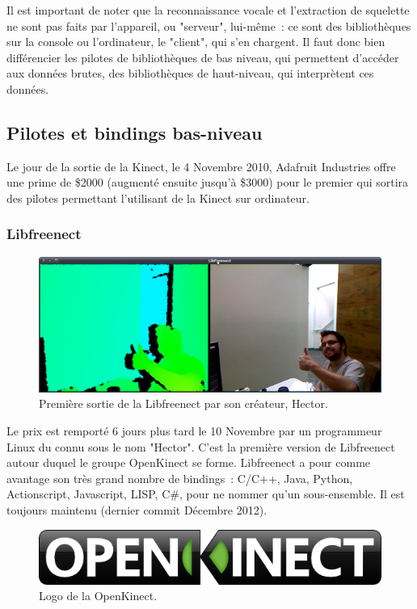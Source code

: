 Il est important de noter que la reconnaissance vocale et l'extraction de 
squelette ne sont pas faits par l'appareil, ou "serveur", lui-même~: ce sont des
bibliothèques sur la console ou l'ordinateur, le "client", qui s'en chargent. 
Il faut donc bien
différencier les pilotes de bibliothèques de bas niveau, qui permettent 
d'accéder aux données brutes, des
bibliothèques de haut-niveau, qui interprètent ces données.

\subsection{Pilotes et bindings bas-niveau}
Le jour de la sortie de la Kinect, le 4 Novembre 2010, Adafruit Industries 
offre une prime de \$2000 (augmenté ensuite jusqu'à \$3000) pour le premier qui
sortira des pilotes permettant l'utilisant de la Kinect sur ordinateur.
\subsubsection{Libfreenect}
\begin{figure}[h!]
\centering
\includegraphics[width=\linewidth]{images/hector}
\caption{Première sortie de la Libfreenect par son créateur, Hector.}
\end{figure}
Le prix est remporté 6 jours plus tard le 10 Novembre par un programmeur Linux
du connu sous le nom "Hector". C'est la première version de Libfreenect autour
duquel le groupe OpenKinect se forme. Libfreenect a pour comme avantage son
très grand nombre de bindings~: C/C++, Java, Python, Actionscript, Javascript,
LISP, C\#, pour ne nommer qu'un sous-ensemble. 
Il est toujours maintenu (dernier commit Décembre 2012).
\begin{figure}[h!]
\centering
\includegraphics[width=0.5\linewidth]{images/openkinect_logo}
\caption{Logo de la OpenKinect.}
\end{figure}

